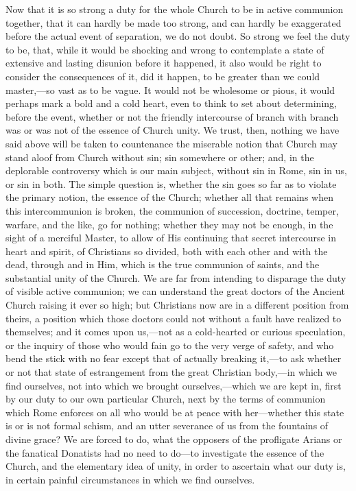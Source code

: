 Now that it is so strong a duty for the whole
Church to be in active communion together, that it can hardly be made
too strong, and can hardly be exaggerated before the actual event of
separation, we do not doubt. So strong we feel the duty to be, that,
while it would be shocking and wrong to contemplate a state of
extensive and lasting disunion before it happened, it also would be
right to consider the consequences of it, did it happen, to be greater
than we could master,—so vast as to be vague. It would not be
wholesome or pious, it would perhaps mark a bold and a cold heart,
even to think to set about determining, before the event, whether or
not the friendly intercourse of branch with branch was or was not of
the essence of Church unity. We trust, then, nothing we have said
above will be taken to countenance the miserable notion that Church
may stand aloof from Church without sin; sin somewhere or other; and,
in the deplorable controversy which is our main subject, without sin
in Rome, sin in us, or sin in both. The simple question is, whether
the sin goes so far as to violate the primary notion, the essence of
the Church; whether all that remains when this intercommunion is
broken, the communion of succession, doctrine, temper, warfare, and
the like, go for nothing; whether they may not be enough, in the sight
of a merciful Master, to allow of His continuing that secret
intercourse in heart and spirit, of Christians so divided, both with
each other and with the dead, through and in Him, which is the true
communion of saints, and the substantial unity of the Church. We are
far from intending to disparage the duty of visible active communion;
we can understand the great doctors of the Ancient Church raising it
ever so high; but Christians now are in a different position from
theirs, a position which those doctors could not without a fault have
realized to themselves; and it comes upon us,—not as a cold-hearted
or curious speculation, or the inquiry of those who would fain go to
the very verge of safety, and who bend the stick with no fear except
that of actually breaking it,—to ask whether or not that state
of estrangement from the great Christian body,—in which we find
ourselves, not into which we brought ourselves,—which we are kept
in, first by our duty to our own particular Church, next by the terms
of communion which Rome enforces on all who would be at peace with
her—whether this state is or is not formal schism, and an utter
severance of us from the fountains of divine grace? We are forced to
do, what the opposers of the profligate Arians or the fanatical
Donatists had no need to do—to investigate the essence of the
Church, and the elementary idea of unity, in order to ascertain what
our duty is, in certain painful circumstances in which we find
ourselves.

